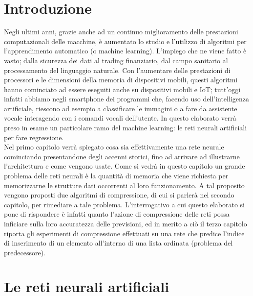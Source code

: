 \documentclass[12pt]{report}
\begin{document}


\tableofcontents

\linespread{1.4}\selectfont

\chapter*{Introduzione}
Negli ultimi anni, grazie anche ad un continuo miglioramento delle prestazioni computazionali delle macchine, è aumentato lo studio e l'utilizzo di algoritmi per l'apprendimento automatico (o machine learning). L'impiego che ne viene fatto è vasto; dalla sicurezza dei dati al trading finanziario, dal campo sanitario al processamento del linguaggio naturale. Con l'aumentare delle prestazioni di processori e le dimensioni della memoria di dispositivi mobili, questi algoritmi hanno cominciato ad essere eseguiti anche su dispositivi mobili e IoT; tutt'oggi infatti abbiamo negli smartphone dei programmi che, facendo uso dell'intelligenza artificiale, riescono ad esempio a classificare le immagini o a fare da assistente vocale interagendo con i comandi vocali dell'utente. 
In questo elaborato verrà preso in esame un particolare ramo del machine learning: le reti neurali artificiali per fare regressione. \\
Nel primo capitolo verrà spiegato cosa sia effettivamente una rete neurale cominciando presentandone degli accenni storici, fino ad arrivare ad illustrarne l'architettura e come vengono usate. Come si vedrà in questo capitolo un grande problema delle reti neurali è la quantità di memoria che viene richiesta per memorizzarne le strutture dati occorrenti al loro funzionamento. A tal proposito vengono proposti due algoritmi di compressione, di cui si parlerà nel secondo capitolo, per rimediare a tale problema. L'interrogativo a cui questo elaborato si pone di rispondere è infatti quanto l'azione di compressione delle reti possa inficiare sulla loro accuratezza delle previsioni, ed in merito a ciò il terzo capitolo riporta gli esperimenti di compressione effettuati su una rete che predice l'indice di inserimento di un elemento all'interno di una lista ordinata (problema del predecessore).

\chapter{Le reti neurali artificiali}
\end{document}
